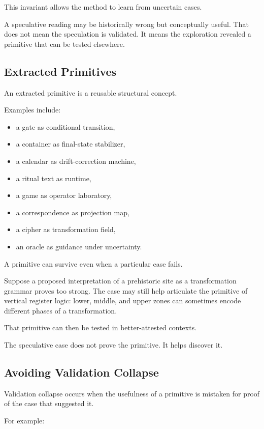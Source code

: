 \documentclass[11pt]{book}
\begin{document}
This invariant allows the method to learn from uncertain cases.

A speculative reading may be historically wrong but conceptually useful. That does not mean the speculation is validated. It means the exploration revealed a primitive that can be tested elsewhere.

\subsection{Extracted Primitives}

An extracted primitive is a reusable structural concept.

Examples include:

\begin{itemize}
    \item a gate as conditional transition,
    \item a container as final-state stabilizer,
    \item a calendar as drift-correction machine,
    \item a ritual text as runtime,
    \item a game as operator laboratory,
    \item a correspondence as projection map,
    \item a cipher as transformation field,
    \item an oracle as guidance under uncertainty.
\end{itemize}

A primitive can survive even when a particular case fails.

Suppose a proposed interpretation of a prehistoric site as a transformation grammar proves too strong. The case may still help articulate the primitive of vertical register logic: lower, middle, and upper zones can sometimes encode different phases of a transformation.

That primitive can then be tested in better-attested contexts.

The speculative case does not prove the primitive. It helps discover it.

\subsection{Avoiding Validation Collapse}

Validation collapse occurs when the usefulness of a primitive is mistaken for proof of the case that suggested it.

For example:
\end{document}
